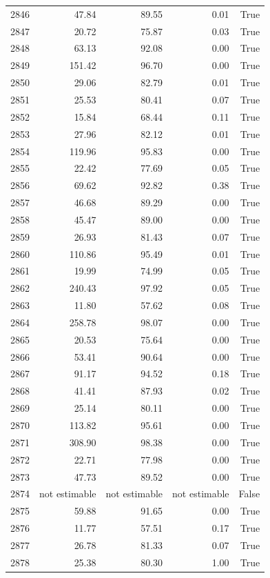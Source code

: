 \begin{longtable}{rrrrr}
2846 & 47.84 & 89.55 & 0.01 & True \\
2847 & 20.72 & 75.87 & 0.03 & True \\
2848 & 63.13 & 92.08 & 0.00 & True \\
2849 & 151.42 & 96.70 & 0.00 & True \\
2850 & 29.06 & 82.79 & 0.01 & True \\
2851 & 25.53 & 80.41 & 0.07 & True \\
2852 & 15.84 & 68.44 & 0.11 & True \\
2853 & 27.96 & 82.12 & 0.01 & True \\
2854 & 119.96 & 95.83 & 0.00 & True \\
2855 & 22.42 & 77.69 & 0.05 & True \\
2856 & 69.62 & 92.82 & 0.38 & True \\
2857 & 46.68 & 89.29 & 0.00 & True \\
2858 & 45.47 & 89.00 & 0.00 & True \\
2859 & 26.93 & 81.43 & 0.07 & True \\
2860 & 110.86 & 95.49 & 0.01 & True \\
2861 & 19.99 & 74.99 & 0.05 & True \\
2862 & 240.43 & 97.92 & 0.05 & True \\
2863 & 11.80 & 57.62 & 0.08 & True \\
2864 & 258.78 & 98.07 & 0.00 & True \\
2865 & 20.53 & 75.64 & 0.00 & True \\
2866 & 53.41 & 90.64 & 0.00 & True \\
2867 & 91.17 & 94.52 & 0.18 & True \\
2868 & 41.41 & 87.93 & 0.02 & True \\
2869 & 25.14 & 80.11 & 0.00 & True \\
2870 & 113.82 & 95.61 & 0.00 & True \\
2871 & 308.90 & 98.38 & 0.00 & True \\
2872 & 22.71 & 77.98 & 0.00 & True \\
2873 & 47.73 & 89.52 & 0.00 & True \\
2874 & not estimable & not estimable & not estimable & False \\
2875 & 59.88 & 91.65 & 0.00 & True \\
2876 & 11.77 & 57.51 & 0.17 & True \\
2877 & 26.78 & 81.33 & 0.07 & True \\
2878 & 25.38 & 80.30 & 1.00 & True \\

\end{longtable}
